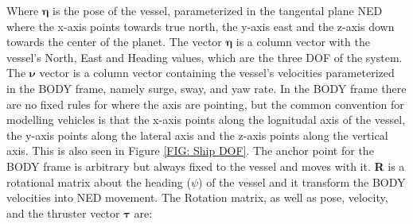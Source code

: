 Where $\bm{\eta}$ is the pose of the vessel, parameterized in the tangental plane \gls{NED} where the x-axis points towards true north, the y-axis east and the z-axis down towards the center of the planet.
The vector $\bm{\eta}$ is a column vector with the vessel's North, East and Heading values, which are the three \gls{DOF} of the system. The $\bm{\nu}$ vector is a column vector containing
the vessel's velocities parameterized in the BODY frame, namely surge, sway, and yaw rate. In the BODY frame there are no fixed rules for where the axis are pointing, but the common convention for modelling
vehicles is that the x-axis points along the lognitudal axis of the vessel, the y-axis points along the lateral axis and the z-axis points along the vertical axis. This is also seen in Figure \ref{FIG: Ship DOF}.
The anchor point for the BODY frame is arbitrary but always fixed to the vessel and moves with it. \textbf{R} is a rotational matrix about the heading ($\psi$) of the vessel and it transform the BODY velocities into
NED movement. 
The Rotation matrix, as well as pose, velocity, and the thruster vector $\bm{\tau}$ are:

